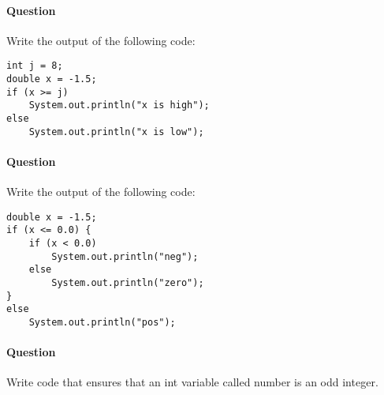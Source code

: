 \documentclass{article}
\begin{document}
\addtocounter{question_num}{1}
\paragraph{Question }
Write the output of the following code:
\begin{lstlisting}
int j = 8;
double x = -1.5;
if (x >= j)
	System.out.println("x is high");
else
	System.out.println("x is low");
\end{lstlisting}

\addtocounter{question_num}{1}
\paragraph{Question }
Write the output of the following code:
\begin{lstlisting}
double x = -1.5;
if (x <= 0.0) {
	if (x < 0.0)
		System.out.println("neg");
	else
		System.out.println("zero");
}
else
	System.out.println("pos");
\end{lstlisting}

\addtocounter{question_num}{1}
\paragraph{Question }
Write code that ensures that an int variable called number is an odd integer.
\end{document}

